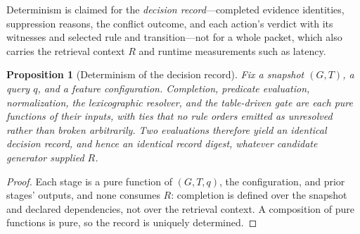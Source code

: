 \documentclass[conference]{IEEEtran}
\newtheorem{proposition}{Proposition}
\begin{document}
Determinism is claimed for the \emph{decision record}---completed evidence identities, suppression reasons, the conflict outcome, and each action's verdict with its witnesses and selected rule and transition---not for a whole packet, which also carries the retrieval context $R$ and runtime measurements such as latency.
\begin{proposition}[Determinism of the decision record]
\label{prop:replay}
Fix a snapshot $(G,T)$, a query $q$, and a feature configuration. Completion, predicate evaluation, normalization, the lexicographic resolver, and the table-driven gate are each pure functions of their inputs, with ties that no rule orders emitted as unresolved rather than broken arbitrarily. Two evaluations therefore yield an identical decision record, and hence an identical record digest, whatever candidate generator supplied $R$.
\end{proposition}
\begin{proof}
Each stage is a pure function of $(G,T,q)$, the configuration, and prior stages' outputs, and none consumes $R$: completion is defined over the snapshot and declared dependencies, not over the retrieval context. A composition of pure functions is pure, so the record is uniquely determined.\qedhere
\end{proof}
\end{document}
